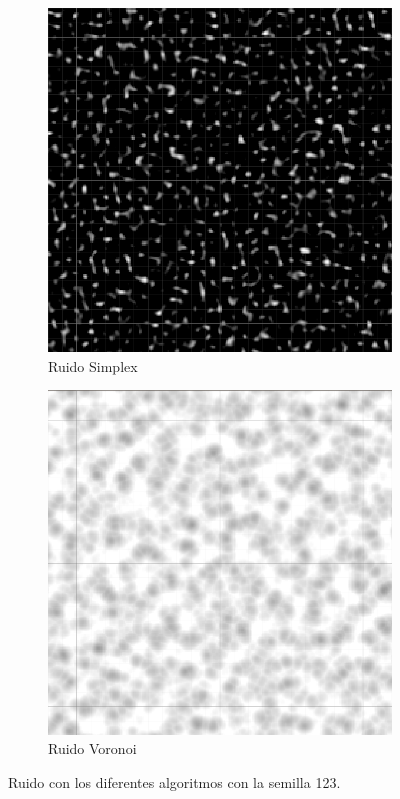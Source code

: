 \begin{itemize}
\begin{figure}[ht]
\begin{subfigure}{0.3\linewidth}
            \includegraphics[width=\linewidth]{img/codes/Simplex123.png}
            \caption{Ruido Simplex}
        \end{subfigure}
        \hfill
        \begin{subfigure}{0.3\linewidth}
            \centering
            \includegraphics[width=\linewidth]{img/codes/Voronoi123.png}
            \caption{Ruido Voronoi}
        \end{subfigure}
        \caption{Ruido con los diferentes algoritmos con la semilla 123.}
    \end{figure}


\end{itemize}
